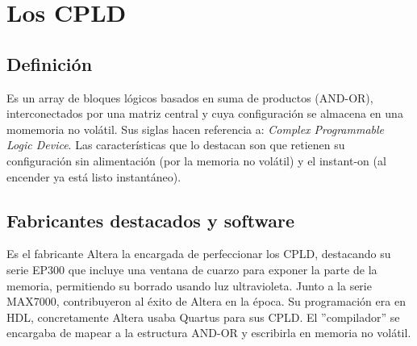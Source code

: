 \section{Los CPLD}
    \subsection{Definición}
        \sangria{} Es un array de bloques lógicos basados en suma de productos (AND-OR), interconectados por una matriz central y cuya configuración se almacena en una momemoria no volátil.
        \sangria{} Sus siglas hacen referencia a: \textit{Complex Programmable Logic Device}. Las características que lo destacan son que retienen su configuración sin alimentación (por la memoria no volátil) y el instant-on (al encender ya está listo instantáneo).

    \subsection{Fabricantes destacados y software}
        \sangria{} Es el fabricante Altera la encargada de perfeccionar los CPLD, destacando su serie EP300 que incluye una ventana de cuarzo para exponer la parte de la memoria, permitiendo su borrado usando luz ultravioleta. Junto a la serie MAX7000, contribuyeron al éxito de Altera en la época.
        \sangria{} Su programación era en HDL, concretamente Altera usaba Quartus para sus CPLD. El ''compilador'' se encargaba de mapear a la estructura AND-OR y escribirla en memoria no volátil.
